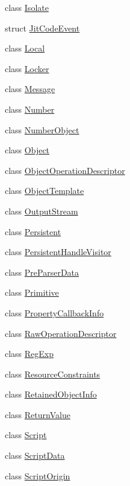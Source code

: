 \begin{DoxyCompactItemize}
\item 
class \hyperlink{classv8_1_1_isolate}{Isolate}
\item 
struct \hyperlink{structv8_1_1_jit_code_event}{Jit\+Code\+Event}
\item 
class \hyperlink{classv8_1_1_local}{Local}
\item 
class \hyperlink{classv8_1_1_locker}{Locker}
\item 
class \hyperlink{classv8_1_1_message}{Message}
\item 
class \hyperlink{classv8_1_1_number}{Number}
\item 
class \hyperlink{classv8_1_1_number_object}{Number\+Object}
\item 
class \hyperlink{classv8_1_1_object}{Object}
\item 
class \hyperlink{classv8_1_1_object_operation_descriptor}{Object\+Operation\+Descriptor}
\item 
class \hyperlink{classv8_1_1_object_template}{Object\+Template}
\item 
class \hyperlink{classv8_1_1_output_stream}{Output\+Stream}
\item 
class \hyperlink{classv8_1_1_persistent}{Persistent}
\item 
class \hyperlink{classv8_1_1_persistent_handle_visitor}{Persistent\+Handle\+Visitor}
\item 
class \hyperlink{classv8_1_1_pre_parser_data}{Pre\+Parser\+Data}
\item 
class \hyperlink{classv8_1_1_primitive}{Primitive}
\item 
class \hyperlink{classv8_1_1_property_callback_info}{Property\+Callback\+Info}
\item 
class \hyperlink{classv8_1_1_raw_operation_descriptor}{Raw\+Operation\+Descriptor}
\item 
class \hyperlink{classv8_1_1_reg_exp}{Reg\+Exp}
\item 
class \hyperlink{classv8_1_1_resource_constraints}{Resource\+Constraints}
\item 
class \hyperlink{classv8_1_1_retained_object_info}{Retained\+Object\+Info}
\item 
class \hyperlink{classv8_1_1_return_value}{Return\+Value}
\item 
class \hyperlink{classv8_1_1_script}{Script}
\item 
class \hyperlink{classv8_1_1_script_data}{Script\+Data}
\item 
class \hyperlink{classv8_1_1_script_origin}{Script\+Origin}
\item 

\end{DoxyCompactItemize}
